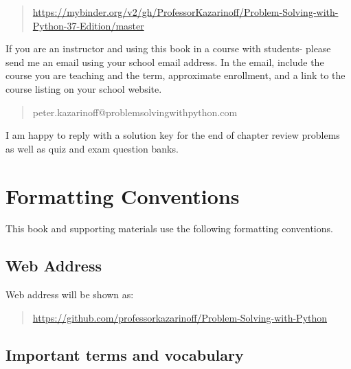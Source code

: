 \documentclass{book}
\begin{document}
\begin{quote}
\url{https://mybinder.org/v2/gh/ProfessorKazarinoff/Problem-Solving-with-Python-37-Edition/master}
\end{quote}

If you are an instructor and using this book in a course with students-
please send me an email using your school email address. In the email,
include the course you are teaching and the term, approximate
enrollment, and a link to the course listing on your school website.

\begin{quote}
peter.kazarinoff@problemsolvingwithpython.com
\end{quote}

I am happy to reply with a solution key for the end of chapter review
problems as well as quiz and exam question banks.
    




    
        \hypertarget{formatting-conventions}{%
\section*{Formatting Conventions}\label{formatting-conventions} 
 }    




    
        This book and supporting materials use the following formatting
conventions.
    




    
        \hypertarget{web-address}{%
\subsection{Web Address}\label{web-address}}

Web address will be shown as:

\begin{quote}
\url{https://github.com/professorkazarinoff/Problem-Solving-with-Python}
\end{quote}
    




    
        \hypertarget{important-terms-and-vocabulary}{%
\subsection{Important terms and
vocabulary}\label{important-terms-and-vocabulary}}
\end{document}
